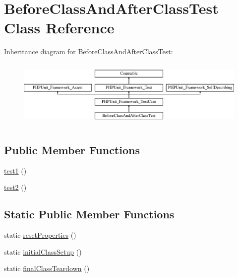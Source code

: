 \hypertarget{class_before_class_and_after_class_test}{}\section{Before\+Class\+And\+After\+Class\+Test Class Reference}
\label{class_before_class_and_after_class_test}
Inheritance diagram for Before\+Class\+And\+After\+Class\+Test\+:\begin{figure}[H]
\begin{center}
\leavevmode
\includegraphics[height=3.303835cm]{class_before_class_and_after_class_test}
\end{center}
\end{figure}
\subsection*{Public Member Functions}
\begin{DoxyCompactItemize}
\item 
\mbox{\hyperlink{class_before_class_and_after_class_test_a9e2276037cf701ed1bf0dba589e19c51}{test1}} ()
\item 
\mbox{\hyperlink{class_before_class_and_after_class_test_ac1e2d86a33f7b563e1d5e317974d9074}{test2}} ()
\end{DoxyCompactItemize}
\subsection*{Static Public Member Functions}
\begin{DoxyCompactItemize}
\item 
static \mbox{\hyperlink{class_before_class_and_after_class_test_a005afccec5fc30c336e4d5d9287760a6}{reset\+Properties}} ()
\item 
static \mbox{\hyperlink{class_before_class_and_after_class_test_aceb165ef388e619da526d8ad0049e90d}{initial\+Class\+Setup}} ()
\item 
static \mbox{\hyperlink{class_before_class_and_after_class_test_a3bfb1b9495124cd44d8d965d905451eb}{final\+Class\+Teardown}} ()
\end{DoxyCompactItemize}
